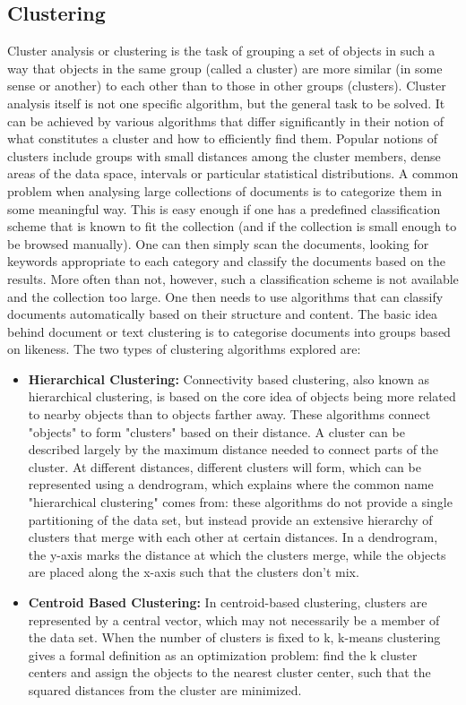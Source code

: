 \documentclass[journal]{IEEEtran}
\begin{document}
\subsection{Clustering}
Cluster analysis or clustering is the task of grouping a set of objects in such a way that objects in the same group (called a cluster) are more similar (in some sense or another) to each other than to those in other groups (clusters). Cluster analysis itself is not one specific algorithm, but the general task to be solved. It can be achieved by various algorithms that differ significantly in their notion of what constitutes a cluster and how to efficiently find them. Popular notions of clusters include groups with small distances among the cluster members, dense areas of the data space, intervals or particular statistical distributions.
A common problem when analysing large collections of documents is to categorize them in some meaningful way. This is easy enough if one has a predefined classification scheme that is known to fit the collection (and if the collection is small enough to be browsed manually). One can then simply scan the documents, looking for keywords appropriate to each category and classify the documents based on the results. More often than not, however, such a classification scheme is not available and the collection too large. One then needs to use algorithms that can classify documents automatically based on their structure and content. The basic idea behind document or text clustering is to categorise documents into groups based on likeness. 
The two types of clustering algorithms explored are:
\begin{itemize}
    \item \textbf{Hierarchical Clustering:} Connectivity based clustering, also known as hierarchical clustering, is based on the core idea of objects being more related to nearby objects than to objects farther away. These algorithms connect "objects" to form "clusters" based on their distance. A cluster can be described largely by the maximum distance needed to connect parts of the cluster. At different distances, different clusters will form, which can be represented using a dendrogram, which explains where the common name "hierarchical clustering" comes from: these algorithms do not provide a single partitioning of the data set, but instead provide an extensive hierarchy of clusters that merge with each other at certain distances. In a dendrogram, the y-axis marks the distance at which the clusters merge, while the objects are placed along the x-axis such that the clusters don't mix.
    \item \textbf{Centroid Based Clustering:} In centroid-based clustering, clusters are represented by a central vector, which may not necessarily be a member of the data set. When the number of clusters is fixed to k, k-means clustering gives a formal definition as an optimization problem: find the k cluster centers and assign the objects to the nearest cluster center, such that the squared distances from the cluster are minimized.
\end{itemize}
\end{document}

